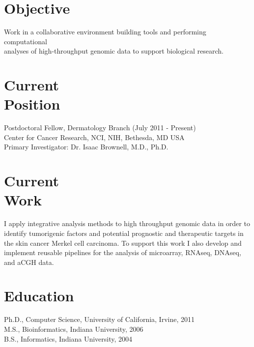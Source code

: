 \documentclass[margin,line]{res}
\begin{document}
\address{\textbf{E-mail:} kenny.daily@nih.gov \textbf{Web:} www.kennydaily.net}
\address{10 Center Drive, Building 10 Room 12N202, Bethesda, MD 20892}

\begin{resume}


\section{\sc Objective}
Work in a collaborative environment building tools and performing computational\\
analyses of high-throughput genomic data to support biological research.

\section{\sc Current\\Position}
Postdoctoral Fellow, Dermatology Branch  (July 2011 - Present)\\
Center for Cancer Research, NCI, NIH, Bethesda, MD USA \\
Primary Investigator: Dr. Isaac Brownell, M.D., Ph.D.

\section{\sc Current\\Work}
I apply integrative analysis methods to high throughput genomic data in order to identify tumorigenic factors and potential prognostic and therapeutic targets in the skin cancer Merkel cell carcinoma.
To support this work I also develop and implement reusable pipelines for the analysis of microarray, RNAseq, DNAseq, and aCGH data.

\section{\sc Education}
Ph.D., Computer Science, University of California, Irvine, 2011\\%
M.S., Bioinformatics, Indiana University, 2006\\%
B.S., Informatics, Indiana University, 2004%


\end{resume}
\end{document}
